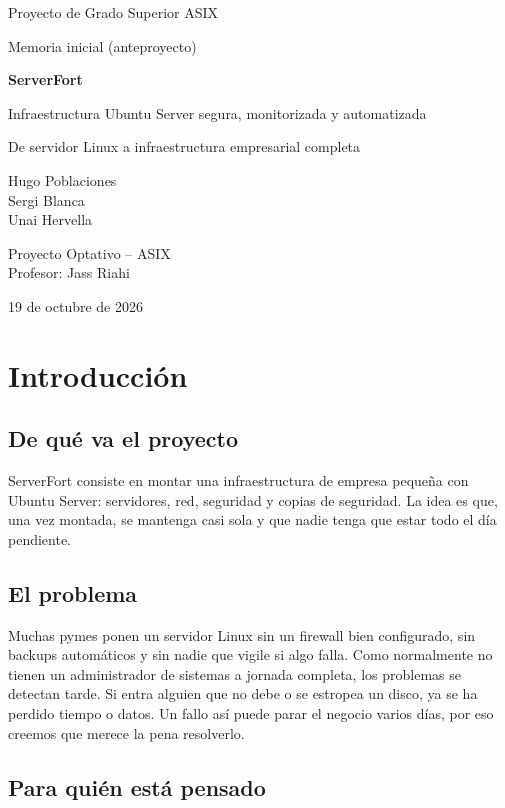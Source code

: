 \documentclass[11pt,a4paper]{report}
\begin{document}
\begin{titlepage}
\centering
{\large Proyecto de Grado Superior ASIX\par}
\vspace{1cm}
{\large Memoria inicial (anteproyecto)\par}
\vspace{2cm}
{\Huge\bfseries ServerFort\par}
\vspace{1cm}
{\Large Infraestructura Ubuntu Server segura, monitorizada y automatizada\par}
\vspace{0.8cm}
{\large De servidor Linux a infraestructura empresarial completa\par}
\vfill
Hugo Poblaciones\\Sergi Blanca\\Unai Hervella
\vspace{1cm}

Proyecto Optativo -- ASIX\\Profesor: Jass Riahi
\vspace{1cm}

19 de octubre de 2026
\end{titlepage}
\tableofcontents

\chapter{Introducción}

\section{De qué va el proyecto}
 ServerFort consiste en montar una infraestructura de empresa pequeña con Ubuntu Server: servidores, red, seguridad y copias de seguridad. La idea es que, una vez montada, se mantenga casi sola y que nadie tenga que estar todo el día pendiente. 
\section{El problema}
 Muchas pymes ponen un servidor Linux sin un firewall bien configurado, sin backups automáticos y sin nadie que vigile si algo falla. Como normalmente no tienen un administrador de sistemas a jornada completa, los problemas se detectan tarde. Si entra alguien que no debe o se estropea un disco, ya se ha perdido tiempo o datos. Un fallo así puede parar el negocio varios días, por eso creemos que merece la pena resolverlo. 
\section{Para quién está pensado}
 
\end{document}
